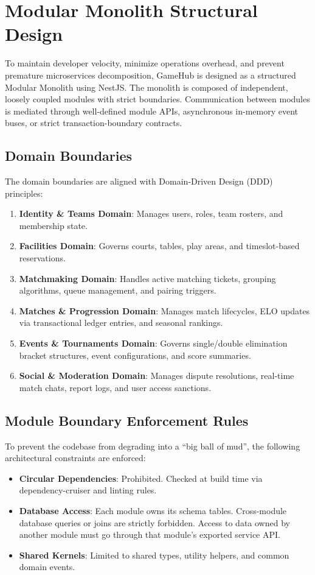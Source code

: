 \documentclass[11pt,a4paper]{report}
\begin{document}
\newpage

\section{Modular Monolith Structural Design}
To maintain developer velocity, minimize operations overhead, and prevent premature microservices decomposition, GameHub is designed as a structured Modular Monolith using NestJS. 
The monolith is composed of independent, loosely coupled modules with strict boundaries. Communication between modules is mediated through well-defined module APIs, asynchronous in-memory event buses, or strict transaction-boundary contracts.

\subsection{Domain Boundaries}
The domain boundaries are aligned with Domain-Driven Design (DDD) principles:
\begin{enumerate}
    \item \textbf{Identity \& Teams Domain}: Manages users, roles, team rosters, and membership state.
    \item \textbf{Facilities Domain}: Governs courts, tables, play areas, and timeslot-based reservations.
    \item \textbf{Matchmaking Domain}: Handles active matching tickets, grouping algorithms, queue management, and pairing triggers.
    \item \textbf{Matches \& Progression Domain}: Manages match lifecycles, ELO updates via transactional ledger entries, and seasonal rankings.
    \item \textbf{Events \& Tournaments Domain}: Governs single/double elimination bracket structures, event configurations, and score summaries.
    \item \textbf{Social \& Moderation Domain}: Manages dispute resolutions, real-time match chats, report logs, and user access sanctions.
\end{enumerate}

\subsection{Module Boundary Enforcement Rules}
To prevent the codebase from degrading into a ``big ball of mud'', the following architectural constraints are enforced:
\begin{itemize}
    \item \textbf{Circular Dependencies}: Prohibited. Checked at build time via dependency-cruiser and linting rules.
    \item \textbf{Database Access}: Each module owns its schema tables. Cross-module database queries or joins are strictly forbidden. Access to data owned by another module must go through that module's exported service API.
    \item \textbf{Shared Kernels}: Limited to shared types, utility helpers, and common domain events.
\end{itemize}
\end{document}
